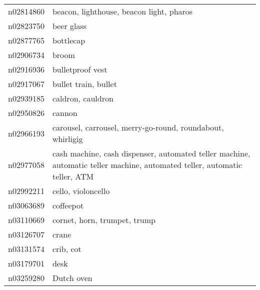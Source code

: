 \begin{appendices}
\begin{longtabu}{X|X[4]}
    		n02814860 &                                                                                   beacon, lighthouse, beacon light, pharos \tabularnewline
    		n02823750 &                                                                                                                 beer glass \tabularnewline
    		n02877765 &                                                                                                                  bottlecap \tabularnewline
    		n02906734 &                                                                                                                      broom \tabularnewline
    		n02916936 &                                                                                                           bulletproof vest \tabularnewline
    		n02917067 &                                                                                                       bullet train, bullet \tabularnewline
    		n02939185 &                                                                                                          caldron, cauldron \tabularnewline
    		n02950826 &                                                                                                                     cannon \tabularnewline
    		n02966193 &                                                                 carousel, carrousel, merry-go-round, roundabout, whirligig \tabularnewline
    		n02977058 &  cash machine, cash dispenser, automated teller machine, automatic teller machine, automated teller, automatic teller, ATM \tabularnewline
    		n02992211 &                                                                                                         cello, violoncello \tabularnewline
    		n03063689 &                                                                                                                  coffeepot \tabularnewline
    		n03110669 &                                                                                               cornet, horn, trumpet, trump \tabularnewline
    		n03126707 &                                                                                                                      crane \tabularnewline
    		n03131574 &                                                                                                                  crib, cot \tabularnewline
    		n03179701 &                                                                                                                       desk \tabularnewline
    		n03259280 &                                                                                                                 Dutch oven \tabularnewline

\end{longtabu}
\end{appendices}
